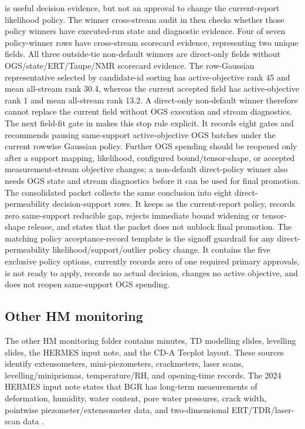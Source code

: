 is useful decision evidence, but not an approval to change the current-report
likelihood policy.
The winner cross-stream audit in
then checks whether those policy winners have executed-run state and diagnostic
evidence.  Four of seven policy-winner rows have cross-stream scorecard evidence,
representing two unique fields.  All three outside-tie non-default winners are
direct-only fields without OGS/state/ERT/Taupe/NMR scorecard evidence.  The
row-Gaussian representative selected by candidate-id sorting has active-objective
rank 45 and mean all-stream rank 30.4, whereas the current accepted field has
active-objective rank 1 and mean all-stream rank 13.2.  A direct-only non-default
winner therefore cannot replace the current field without OGS execution and stream
diagnostics.
The next field-fit gate in
 makes this stop rule
explicit.  It records eight gates and recommends pausing same-support
active-objective OGS batches under the current rowwise Gaussian policy.  Further OGS
spending should be reopened only after a support mapping, likelihood, configured
bound/tensor-shape, or accepted measurement-stream objective changes; a non-default
direct-policy winner also needs OGS state and stream diagnostics before it can be
used for final promotion.
The consolidated packet
collects the same conclusion into eight direct-permeability decision-support rows.
It keeps  as the current-report policy, records
zero same-support reducible gap, rejects immediate bound widening or tensor-shape
release, and states that the packet does not unblock final promotion.
The matching policy acceptance-record template
is the signoff guardrail for any direct-permeability likelihood/support/outlier
policy change.  It contains the five exclusive policy options, currently records
zero of one required primary approvals, is not ready to apply, records no actual
decision, changes no active objective, and does not reopen same-support OGS
spending.

\subsection{Other HM monitoring}

The other HM monitoring folder contains minutes, TD modelling slides, levelling
slides, the HERMES input note, and the CD-A Tecplot layout.  These sources identify
extensometers, mini-piezometers, crackmeters, laser scans, levelling/miniprismas,
temperature/RH, and opening-time records.  The 2024 HERMES input note states that BGR
has long-term measurements of deformation, humidity, water content, pore water
pressures, crack width, pointwise piezometer/extensometer data, and two-dimensional
ERT/TDR/laser-scan data \cite[PDF p.~5]{InputHERMES2024Local}.

